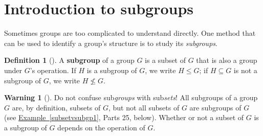 \documentclass[10pt,]{book}
\newcommand{\terminology}[1]{\textbf{#1}}
\theoremstyle{plain}
\theoremstyle{definition}
\newtheorem{definition}[theorem]{Definition}
\theoremstyle{definition}
\newtheorem{warning}[theorem]{Warning}
\theoremstyle{definition}
\theoremstyle{definition}
\numberwithin{equation}{section}
\begin{document}
\section[{Introduction to subgroups}]{Introduction to subgroups}\label{section-13}
Sometimes groups are too complicated to understand directly. One method that can be used to identify a group's structure is to study its \emph{subgroups}.%
\begin{definition}[{}]\label{definition-35}
A \terminology{subgroup} of a group \(G\) is a subset of \(G\) that is also a group under \(G\)'s operation. If \(H\) is a subgroup of \(G\), we write \(H \leq G\); if \(H\subseteq G\) is not a subgroup of \(G\), we write \(H\not\leq G\).%
\end{definition}
\begin{warning}[]\label{warning-17}
Do not confuse sub\emph{groups} with sub\emph{sets}! All subgroups of a group \(G\) are, by definition, subsets of \(G\), but not all subsets of \(G\) are subgroups of \(G\) (see \hyperref[subsetvsubgp1]{Example~\ref{subsetvsubgp1}}, Parts 2\textendash{}5, below). Whether or not a subset of \(G\) is a subgroup of \(G\) depends on the operation of \(G\).%
\end{warning}
\end{document}
